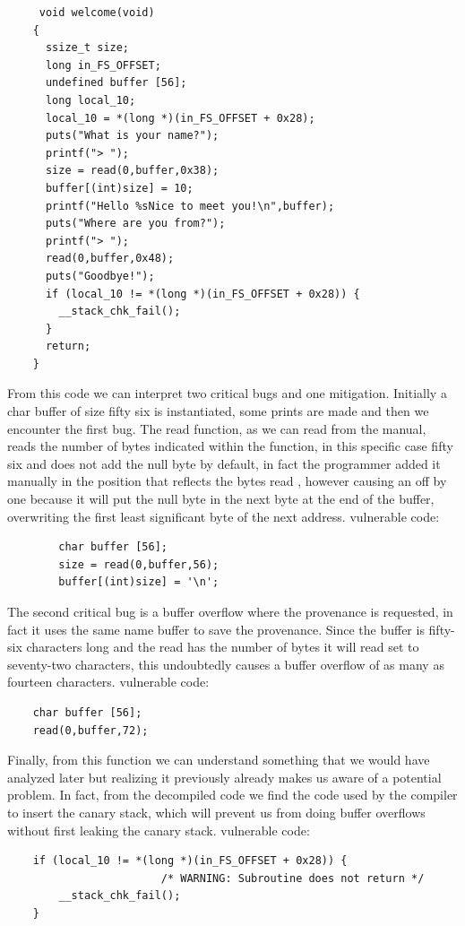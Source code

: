  \begin{verbatim}
     void welcome(void)
    {
      ssize_t size;
      long in_FS_OFFSET;
      undefined buffer [56];
      long local_10;
      local_10 = *(long *)(in_FS_OFFSET + 0x28);
      puts("What is your name?");
      printf("> ");
      size = read(0,buffer,0x38);
      buffer[(int)size] = 10;
      printf("Hello %sNice to meet you!\n",buffer);
      puts("Where are you from?");
      printf("> ");
      read(0,buffer,0x48);
      puts("Goodbye!");
      if (local_10 != *(long *)(in_FS_OFFSET + 0x28)) {
        __stack_chk_fail();
      }
      return;
    }
 \end{verbatim}
        From this code we can interpret two critical bugs and one mitigation.\newline
    Initially a char buffer of size fifty six is instantiated, some prints are made and then we encounter the first bug.\newline
    The read function, as we can read from the manual, reads the number of bytes indicated within the function, in this specific case fifty six and does not add the null byte by default, in fact the programmer added it manually in the position that reflects the bytes read , however causing an off by one because it will put the null byte in the next byte at the end of the buffer, overwriting the first least significant byte of the next address.\newline
    vulnerable code:\newline
    \begin{verbatim} 
        char buffer [56];
        size = read(0,buffer,56);  
        buffer[(int)size] = '\n';
    \end{verbatim}
    The second critical bug is a buffer overflow where the provenance is requested, in fact it uses the same name buffer to save the provenance.
    Since the buffer is fifty-six characters long and the read has the number of bytes it will read set to seventy-two characters, this undoubtedly causes a buffer overflow of as many as fourteen characters.
    vulnerable code:\newline
    \begin{verbatim} 
    char buffer [56];
    read(0,buffer,72);
    \end{verbatim}
    Finally, from this function we can understand something that we would have analyzed later but realizing it previously already makes us aware of a potential problem.\newline
    In fact, from the decompiled code we find the code used by the compiler to insert the canary stack, which will prevent us from doing buffer overflows without first leaking the canary stack.\newline
    vulnerable code:
    \begin{verbatim} 
    if (local_10 != *(long *)(in_FS_OFFSET + 0x28)) {
                        /* WARNING: Subroutine does not return */
        __stack_chk_fail();
    }
    \end{verbatim}
    
